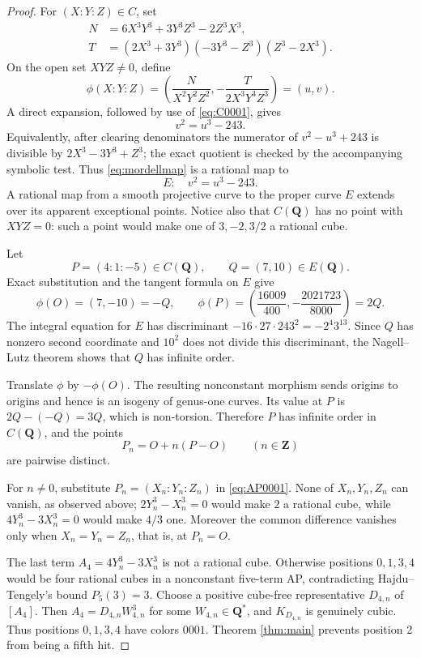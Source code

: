 \documentclass[10pt]{article}
\newcommand{\Q}{\mathbf Q}
\begin{document}
\begin{proof}
For $(X:Y:Z)\in C$, set
\[
 \begin{split}
 N&=6X^3Y^3+3Y^3Z^3-2Z^3X^3,\\
 T&=(2X^3+3Y^3)(-3Y^3-Z^3)(Z^3-2X^3).
 \end{split}
\]
On the open set $XYZ\ne0$, define
\begin{equation}\label{eq:mordellmap}
 \phi(X:Y:Z)=
 \left(\frac{N}{X^2Y^2Z^2},
       -\frac{T}{2X^3Y^3Z^3}\right)=(u,v).
\end{equation}
A direct expansion, followed by use of \eqref{eq:C0001}, gives
\[
 v^2=u^3-243.
\]
Equivalently, after clearing denominators the numerator of
$v^2-u^3+243$ is divisible by $2X^3-3Y^3+Z^3$; the exact quotient is checked
by the accompanying symbolic test.  Thus \eqref{eq:mordellmap} is a rational
map to
\[
 E:\quad v^2=u^3-243.
\]
A rational map from a smooth projective curve to the proper curve $E$ extends
over its apparent exceptional points.  Notice also that $C(\Q)$ has no point
with $XYZ=0$: such a point would make one of $3,-2,3/2$ a rational cube.

Let
\[
 P=(4:1:-5)\in C(\Q),\qquad Q=(7,10)\in E(\Q).
\]
Exact substitution and the tangent formula on $E$ give
\[
 \phi(O)=(7,-10)=-Q,
 \qquad
 \phi(P)=\left(\frac{16009}{400},-
 \frac{2021723}{8000}\right)=2Q.
\]
The integral equation for $E$ has discriminant
$-16\cdot27\cdot243^2=-2^4 3^{13}$.  Since $Q$ has nonzero second
coordinate and $10^2$ does not divide this discriminant, the Nagell--Lutz
theorem shows that $Q$ has infinite order.

Translate $\phi$ by $-\phi(O)$.  The resulting nonconstant morphism sends
origins to origins and hence is an isogeny of genus-one curves.  Its value at
$P$ is $2Q-(-Q)=3Q$, which is non-torsion.  Therefore $P$ has infinite order
in $C(\Q)$, and the points
\[
 P_n=O+n(P-O)\qquad(n\in\mathbf Z)
\]
are pairwise distinct.

For $n\ne0$, substitute $P_n=(X_n:Y_n:Z_n)$ in
\eqref{eq:AP0001}.  None of $X_n,Y_n,Z_n$ can vanish, as observed above;
$2Y_n^3-X_n^3=0$ would make $2$ a rational cube, while
$4Y_n^3-3X_n^3=0$ would make $4/3$ one.  Moreover the common difference
vanishes only when $X_n=Y_n=Z_n$, that is, at $P_n=O$.

The last term $A_4=4Y_n^3-3X_n^3$ is not a rational cube.  Otherwise
positions $0,1,3,4$ would be four rational cubes in a nonconstant five-term
AP, contradicting Hajdu--Tengely's bound $P_5(3)=3$.  Choose a positive
cube-free representative $D_{4,n}$ of $[A_4]$.  Then
$A_4=D_{4,n}W_{4,n}^3$ for some $W_{4,n}\in\Q^*$, and $K_{D_{4,n}}$ is
genuinely cubic.  Thus positions $0,1,3,4$ have colors $0001$.  Theorem
\ref{thm:main} prevents position 2 from being a fifth hit.


\end{proof}
\end{document}
